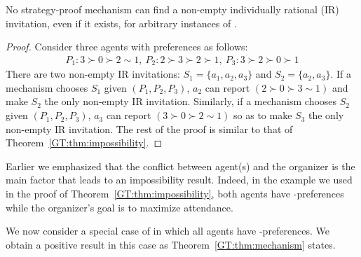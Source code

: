 \begin{theorem} \label{GT:thm:impossibility_IR}
	No strategy-proof mechanism can find a non-empty individually rational (IR) invitation, even if it exists, for arbitrary instances of \ASIP. 
\end{theorem}
\begin{proof}
Consider three agents with preferences as follows:
\begin{equation*}
	\begin{aligned}
			P_1: 3\succ 0 \succ 2 \sim 1,~ P_2: 2 \succ 3 \succ 2 \succ 1, ~ P_3: 3 \succ 2 \succ 0 \succ 1
	\end{aligned}
\end{equation*}
There are two non-empty IR invitations: $S_1 = \{a_1, a_2, a_3\}$ and $S_2 = \{a_2, a_3\}$. 
If a mechanism chooses $S_1$ given $(P_1, P_2, P_3)$, $a_2$ can report $(2 \succ 0 \succ 3 \sim 1)$ and make $S_2$ the only non-empty IR invitation. Similarly, if a mechanism chooses $S_2$ given $(P_1, P_2, P_3)$, $a_3$ can report $(3 \succ 0 \succ 2 \sim 1)$ so as to make $S_3$ the only non-empty IR invitation. The rest of the proof is similar to that of Theorem~\ref{GT:thm:impossibility}.
\end{proof}


Earlier we emphasized that the conflict between agent(s) and the organizer is the main factor that leads to an impossibility result. 
Indeed, in the example we used in the proof of Theorem~\ref{GT:thm:impossibility}, both agents have \DEC-preferences while the organizer's goal is to maximize attendance.

We now consider a special case of \ASIPs in which all agents have \INC-preferences.
We obtain a positive result in this case as Theorem~\ref{GT:thm:mechanism} states. 

